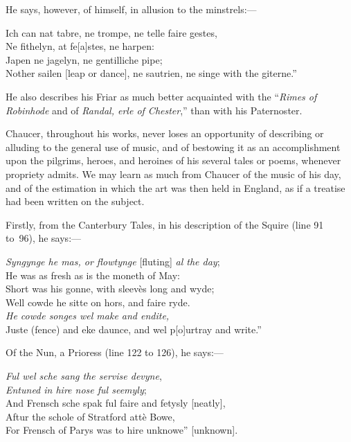 

\renewcommand\rectoheader{pierce plowman.--chaucer.}
\noindent He says, however, of himself, in allusion to the minstrels:—

\settowidth{\versewidth}{Ich can nat tabre, ne trompe, ne telle faire gestes,”}
\begin{scverse}Ich can nat tabre, ne trompe, ne telle faire gestes,\\
Ne fithelyn, at fe[a]stes, ne harpen:\\
Japen ne jagelyn, ne gentilliche pipe;\\
Nother sailen [leap or dance], ne sautrien, ne singe with the giterne.”
\end{scverse}
He also describes his Friar as much better acquainted with the “\textit{Rimes of
Robinhode} and of \textit{Randal, erle of Chester},” than with his Paternoster.

Chaucer, throughout his works, never loses an opportunity of describing or
alluding to the general use of music, and of bestowing it as an accomplishment
upon the pilgrims, heroes, and heroines of his several tales or poems, whenever
propriety admits. We may learn as much from Chaucer of the music of his day,
and of the estimation in which the art was then held in England, as if a treatise
had been written on the subject.

Firstly, from the Canterbury Tales, in his description of the Squire (line 91
to~96), he says:—

\begin{scverse}\textit{Syngynge he mas, or flowtynge} [fluting] \textit{al the day};\\
He was as fresh as is the moneth of May:\\
Short was his gonne, with sleevès long and wyde;\\
Well cowde he sitte on hors, and faire ryde.\\
\textit{He cowde songes wel make and endite,}\\
Juste (fence) and eke daunce, and wel p[o]urtray and write.”
\end{scverse}

Of the Nun, a Prioress (line 122 to 126), he says:—
\begin{scverse}\textit{Ful wel sche sang the servise devyne},\\
\textit{Entuned in hire nose ful seemyly};\\
And Frensch sche spak ful faire and fetysly [neatly],\\
Aftur the schole of Stratford attè Bowe,\\
For Frensch of Parys was to hire unknowe” [unknown].
\end{scverse}

